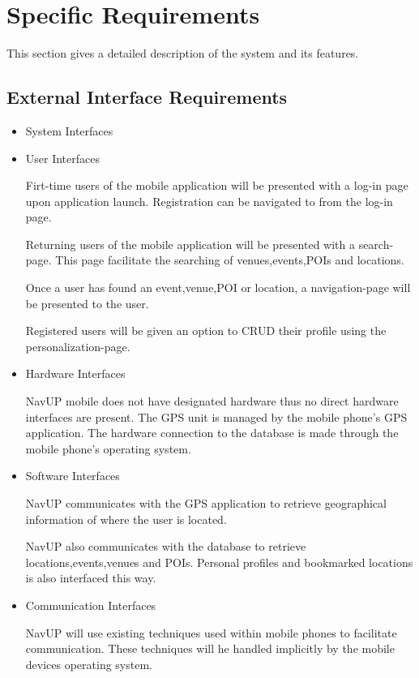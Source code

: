 \documentclass{article}
\begin{document}
\section{Specific Requirements}
    \begin{flushleft}
    This section gives a detailed description of the system and its features.
    \end{flushleft}
    \subsection{External Interface Requirements}
		\begin{itemize}
		
			\item System Interfaces
			\item User Interfaces
			
			Firt-time users of the mobile application will be presented with a log-in page upon application launch. Registration can be navigated to from the log-in page.
			
			Returning users of the mobile application will be presented with a search-page. This page facilitate the searching of venues,events,POIs and locations.
			
			Once a user has found an event,venue,POI or location, a navigation-page will be presented to the user.
			
			Registered users will be given an option to CRUD their profile using the personalization-page.
			
			
			\item Hardware Interfaces
			
			NavUP mobile does not have designated hardware thus no direct hardware interfaces are present. The GPS unit is managed by the mobile phone's GPS application. The hardware connection to the database is made through the mobile phone's operating system.
			
			\item Software Interfaces
			
			NavUP communicates with the GPS application to retrieve geographical information of where the user is located.
			
			NavUP also communicates with the database to retrieve locations,events,venues and POIs. Personal profiles and bookmarked locations is also interfaced this way.
			
			
			\item Communication Interfaces
			
			NavUP will use existing techniques used within mobile phones to facilitate communication. These techniques will he handled implicitly by the mobile devices operating system.
			
		\end{itemize}
\end{document}
